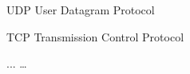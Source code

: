 \begin{siglas}
  \item[UDP] User Datagram Protocol	
  \item[TCP] Transmission Control Protocol
  \item[...] \ldots
\end{siglas}